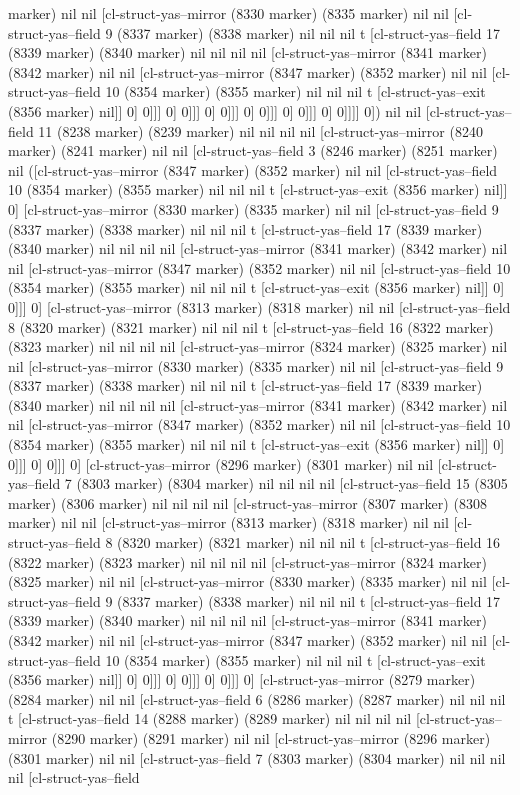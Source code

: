 {{marker) nil nil [cl-struct-yas--mirror (8330 marker) (8335 marker) nil nil [cl-struct-yas--field 9 (8337 marker) (8338 marker) nil nil nil t [cl-struct-yas--field 17 (8339 marker) (8340 marker) nil nil nil nil [cl-struct-yas--mirror (8341 marker) (8342 marker) nil nil [cl-struct-yas--mirror (8347 marker) (8352 marker) nil nil [cl-struct-yas--field 10 (8354 marker) (8355 marker) nil nil nil t [cl-struct-yas--exit (8356 marker) nil]] 0] 0]]] 0] 0]]] 0] 0]]] 0] 0]]] 0] 0]]] 0] 0]]]] 0]) nil nil [cl-struct-yas--field 11 (8238 marker) (8239 marker) nil nil nil nil [cl-struct-yas--mirror (8240 marker) (8241 marker) nil nil [cl-struct-yas--field 3 (8246 marker) (8251 marker) nil ([cl-struct-yas--mirror (8347 marker) (8352 marker) nil nil [cl-struct-yas--field 10 (8354 marker) (8355 marker) nil nil nil t [cl-struct-yas--exit (8356 marker) nil]] 0] [cl-struct-yas--mirror (8330 marker) (8335 marker) nil nil [cl-struct-yas--field 9 (8337 marker) (8338 marker) nil nil nil t [cl-struct-yas--field 17 (8339 marker) (8340 marker) nil nil nil nil [cl-struct-yas--mirror (8341 marker) (8342 marker) nil nil [cl-struct-yas--mirror (8347 marker) (8352 marker) nil nil [cl-struct-yas--field 10 (8354 marker) (8355 marker) nil nil nil t [cl-struct-yas--exit (8356 marker) nil]] 0] 0]]] 0] [cl-struct-yas--mirror (8313 marker) (8318 marker) nil nil [cl-struct-yas--field 8 (8320 marker) (8321 marker) nil nil nil t [cl-struct-yas--field 16 (8322 marker) (8323 marker) nil nil nil nil [cl-struct-yas--mirror (8324 marker) (8325 marker) nil nil [cl-struct-yas--mirror (8330 marker) (8335 marker) nil nil [cl-struct-yas--field 9 (8337 marker) (8338 marker) nil nil nil t [cl-struct-yas--field 17 (8339 marker) (8340 marker) nil nil nil nil [cl-struct-yas--mirror (8341 marker) (8342 marker) nil nil [cl-struct-yas--mirror (8347 marker) (8352 marker) nil nil [cl-struct-yas--field 10 (8354 marker) (8355 marker) nil nil nil t [cl-struct-yas--exit (8356 marker) nil]] 0] 0]]] 0] 0]]] 0] [cl-struct-yas--mirror (8296 marker) (8301 marker) nil nil [cl-struct-yas--field 7 (8303 marker) (8304 marker) nil nil nil nil [cl-struct-yas--field 15 (8305 marker) (8306 marker) nil nil nil nil [cl-struct-yas--mirror (8307 marker) (8308 marker) nil nil [cl-struct-yas--mirror (8313 marker) (8318 marker) nil nil [cl-struct-yas--field 8 (8320 marker) (8321 marker) nil nil nil t [cl-struct-yas--field 16 (8322 marker) (8323 marker) nil nil nil nil [cl-struct-yas--mirror (8324 marker) (8325 marker) nil nil [cl-struct-yas--mirror (8330 marker) (8335 marker) nil nil [cl-struct-yas--field 9 (8337 marker) (8338 marker) nil nil nil t [cl-struct-yas--field 17 (8339 marker) (8340 marker) nil nil nil nil [cl-struct-yas--mirror (8341 marker) (8342 marker) nil nil [cl-struct-yas--mirror (8347 marker) (8352 marker) nil nil [cl-struct-yas--field 10 (8354 marker) (8355 marker) nil nil nil t [cl-struct-yas--exit (8356 marker) nil]] 0] 0]]] 0] 0]]] 0] 0]]] 0] [cl-struct-yas--mirror (8279 marker) (8284 marker) nil nil [cl-struct-yas--field 6 (8286 marker) (8287 marker) nil nil nil t [cl-struct-yas--field 14 (8288 marker) (8289 marker) nil nil nil nil [cl-struct-yas--mirror (8290 marker) (8291 marker) nil nil [cl-struct-yas--mirror (8296 marker) (8301 marker) nil nil [cl-struct-yas--field 7 (8303 marker) (8304 marker) nil nil nil nil [cl-struct-yas--field }}
